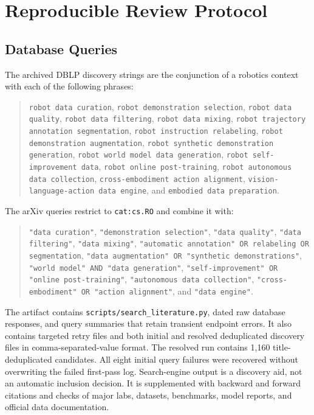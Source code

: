 \section{Reproducible Review Protocol}
\label{app:protocol}

\subsection{Database Queries}

The archived DBLP discovery strings are the conjunction of a robotics context with each of the following phrases:
\begin{quote}\small
\texttt{robot data curation}, \texttt{robot demonstration selection}, \texttt{robot data quality}, \texttt{robot data filtering}, \texttt{robot data mixing}, \texttt{robot trajectory annotation segmentation}, \texttt{robot instruction relabeling}, \texttt{robot demonstration augmentation}, \texttt{robot synthetic demonstration generation}, \texttt{robot world model data generation}, \texttt{robot self-improvement data}, \texttt{robot online post-training}, \texttt{robot autonomous data collection}, \texttt{cross-embodiment action alignment}, \texttt{vision-language-action data engine}, and \texttt{embodied data preparation}.
\end{quote}

The arXiv queries restrict to \texttt{cat:cs.RO} and combine it with:
\begin{quote}\small
\texttt{"data curation"}, \texttt{"demonstration selection"}, \texttt{"data quality"}, \texttt{"data filtering"}, \texttt{"data mixing"}, \texttt{"automatic annotation" OR relabeling OR segmentation}, \texttt{"data augmentation" OR "synthetic demonstrations"}, \texttt{"world model" AND "data generation"}, \texttt{"self-improvement" OR "online post-training"}, \texttt{"autonomous data collection"}, \texttt{"cross-embodiment" OR "action alignment"}, and \texttt{"data engine"}.
\end{quote}

The artifact contains \texttt{scripts/search\_literature.py}, dated raw database responses, and query summaries that retain transient endpoint errors.
It also contains targeted retry files and both initial and resolved deduplicated discovery files in comma-separated-value format.
The resolved run contains 1,160 title-deduplicated candidates.
All eight initial query failures were recovered without overwriting the failed first-pass log.
Search-engine output is a discovery aid, not an automatic inclusion decision.
It is supplemented with backward and forward citations and checks of major labs, datasets, benchmarks, model reports, and official data documentation.


